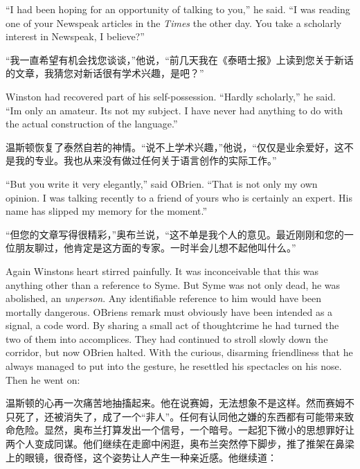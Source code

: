 \begin{paracol}{2}
\switchcolumn*

``I had been hoping for an opportunity of talking to you,'' he said. ``I
was reading one of your Newspeak articles in the \emph{Times} the other
day. You take a scholarly interest in Newspeak, I believe?''

\switchcolumn

``我一直希望有机会找您谈谈，''他说，``前几天我在《泰晤士报》上读到您关于新话的文章，我猜您对新话很有学术兴趣，是吧？''

\switchcolumn*

Winston had recovered part of his self-possession. ``Hardly scholarly,''
he said. ``I\textquotesingle m only an amateur. It\textquotesingle s not
my subject. I have never had anything to do with the actual construction
of the language.''

\switchcolumn

温斯顿恢复了泰然自若的神情。``说不上学术兴趣，''他说，``仅仅是业余爱好，这不是我的专业。我也从来没有做过任何关于语言创作的实际工作。''

\switchcolumn*

``But you write it very elegantly,'' said O\textquotesingle Brien. ``That
is not only my own opinion. I was talking recently to a friend of yours
who is certainly an expert. His name has slipped my memory for the
moment.''

\switchcolumn

``但您的文章写得很精彩，''奥布兰说，``这不单是我个人的意见。最近刚刚和您的一位朋友聊过，他肯定是这方面的专家。一时半会儿想不起他叫什么。''

\switchcolumn*

Again Winston\textquotesingle s heart stirred painfully. It was
inconceivable that this was anything other than a reference to Syme. But
Syme was not only dead, he was abolished, an \emph{unperson}. Any
identifiable reference to him would have been mortally dangerous.
O\textquotesingle Brien\textquotesingle s remark must obviously have
been intended as a signal, a code word. By sharing a small act of
thoughtcrime he had turned the two of them into accomplices. They had
continued to stroll slowly down the corridor, but now
O\textquotesingle Brien halted. With the curious, disarming friendliness
that he always managed to put into the gesture, he resettled his
spectacles on his nose. Then he went on:

\switchcolumn

温斯顿的心再一次痛苦地抽搐起来。他在说赛姆，无法想象不是这样。然而赛姆不只死了，还被消失了，成了一个``非人''。任何有认同他之嫌的东西都有可能带来致命危险。显然，奥布兰打算发出一个信号，一个暗号。一起犯下微小的思想罪好让两个人变成同谋。他们继续在走廊中闲逛，奥布兰突然停下脚步，推了推架在鼻梁上的眼镜，很奇怪，这个姿势让人产生一种亲近感。他继续道：


\end{paracol}
